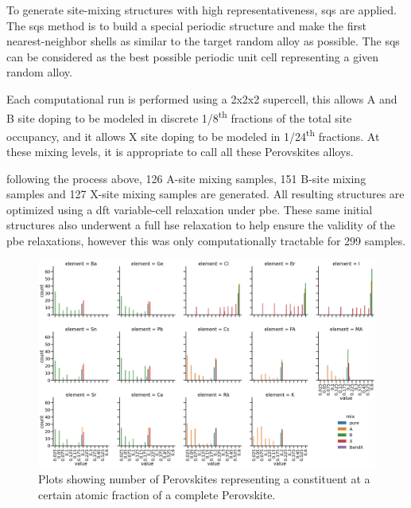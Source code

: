 \documentclass[twoside, twocolumn, 9pt, draft]{article}
\begin{document}
To generate site-mixing structures with high representativeness,
\acrfull{sqs} are
applied. The \acrshort{sqs} method is to build a special
periodic structure and make the first nearest-neighbor shells as
similar to the target random alloy as possible. The
\acrshort{sqs} can be considered as the best possible periodic
unit cell representing a given random alloy.

Each computational run is performed using a 2x2x2 supercell, this
allows A and B site doping to be modeled in discrete 1/8\textsuperscript{th} fractions
of the total site occupancy, and it allows X site doping to be modeled
in 1/24\textsuperscript{th} fractions. At these mixing levels, it is appropriate to
call all these Perovskites alloys.

following the process above, 126 A-site mixing samples, 151 B-site
mixing samples and 127 X-site mixing samples are generated. All
resulting structures are optimized using a \acrshort{dft}
variable-cell relaxation under \acrfull{pbe}. These same
initial structures also underwent a full \acrfull{hse}
relaxation to help ensure the validity of the \acrshort{pbe}
relaxations, however this was only computationally tractable for 299
samples.

\begin{figure}
\centering
\includegraphics[width=.9\linewidth]{variability_of_composition_vectors.png}
\caption{\label{fig:chemspace_uni} Plots showing number of Perovskites representing a constituent at a certain atomic fraction of a complete Perovskite.}
\end{figure}
\end{document}
